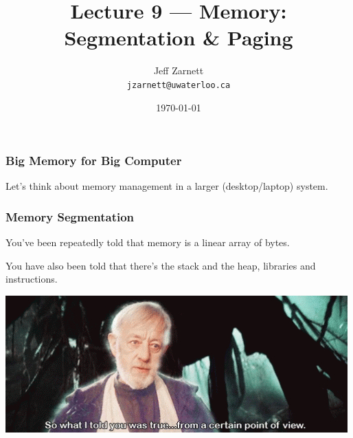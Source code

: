 

\title{Lecture 9 --- Memory: Segmentation \& Paging }

\author{Jeff Zarnett \\ \small \texttt{jzarnett@uwaterloo.ca}}
\date{\today}




\begin{frame}
  \titlepage

 \end{frame}

\begin{frame}
\frametitle{Big Memory for Big Computer}

Let's think about memory management in a larger (desktop/laptop) system.


\end{frame}


\begin{frame}
\frametitle{Memory Segmentation}

You've been repeatedly told that memory is a linear array of bytes. 

You have also been told that there's the stack and the heap, libraries and instructions.

\begin{center}
	\includegraphics[width=\textwidth]{images/pov.jpg}
\end{center}

 \end{frame}



